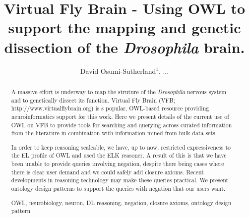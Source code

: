 \documentclass[runningheads,a4paper]{llncs}
\newcommand{\keywords}[1]{\par\addvspace\baselineskip
\noindent\keywordname\enspace\ignorespaces#1}
\begin{document}
\mainmatter  %

\title{Virtual Fly Brain - Using OWL to support the mapping and
  genetic dissection of the \textit{Drosophila} brain.}


%
%
\author{David Osumi-Sutherland$^1$, ...}

%


%
%

\toctitle{}
\tocauthor{}
\maketitle


\begin{abstract}
A massive effort is underway to map the struture of the \textit{Drosophila}
nervous system and to genetically dissect its function. Virtual Fly
Brain (VFB; http://www.virtualflybrain.org) is s popular, OWL-based resource
providing neuroinformatics support for this work.  Here we present
details of the current use of OWL on VFB to provide tools for
searching and querying across curated information from the literature
in combination with information mined from bulk data sets. 

In order to keep reasoning scaleable, we have, up to now, restricted
expressiveness to the EL profile of OWL and used the ELK reasoner. A
result of this is that we have been unable to provide queries
involving negation, despite there being cases where there is clear
user demand and we could safely add closure axioms. Recent
developments in reasoning technology may make these queries
practical.  We present ontology design patterns to support the queries
with negation that our users want.

\keywords{OWL, neurobiology, neuron, DL reasoning, negation, closure
  axioms, ontology design pattern}
\end{abstract}
\end{document}
